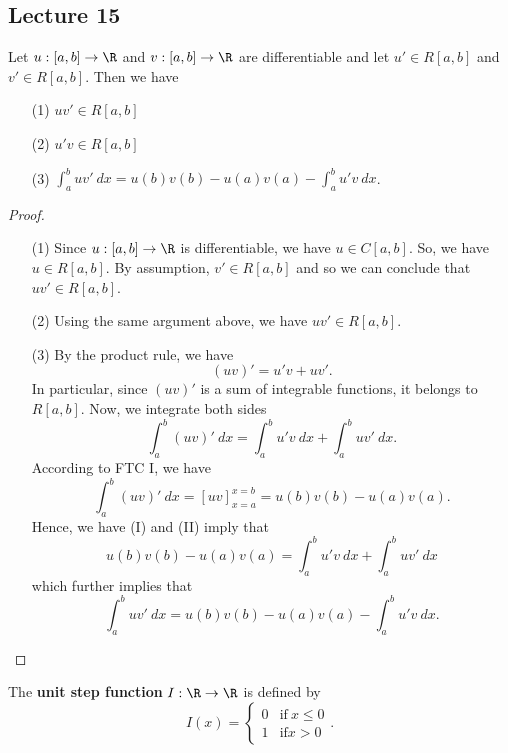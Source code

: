 \subsection{Lecture 15}

\begin{theorem}\label{Integration by Parts}
    Let \( u : [a,b] \to \R  \) and \( v : [a,b] \to \R  \) are differentiable and let \( u' \in R[a,b] \) and \( v' \in R[a,b] \). Then we have  
    \begin{enumerate}
        \item[(1)] \( uv' \in R [a,b] \)
        \item[(2)] \( u' v \in R[a,b] \)
        \item[(3)] \( \displaystyle  \int_{ a }^{ b }  uv'  \ dx = u(b)v(b) - u(a) v(a) - \displaystyle \int_{ a }^{ b } u' v  \ dx  \).
    \end{enumerate}
\end{theorem}

\begin{proof}
\begin{enumerate}
    \item[(1)] Since \( u:[a,b] \to \R  \) is differentiable, we have \( u \in C[a,b] \). So, we have \( u \in R[a,b] \). By assumption, \( v' \in R[a,b] \) and so we can conclude that \( uv' \in R[a,b] \).
    \item[(2)] Using the same argument above, we have \( uv' \in R[a,b] \).
    \item[(3)] By the product rule, we have 
        \[  (uv)' = u' v + u v'. \]
        In particular, since \( (uv)' \) is a sum of integrable functions, it belongs to \( R[a,b] \). Now, we integrate both sides 
        \[  \int_{ a }^{ b }  (uv)'   \ dx = \int_{ a }^{ b } u'v \ dx + \int_{ a }^{ b }  uv' \ dx. \tag{I} \]
        According to FTC I, we have
        \[  \int_{ a }^{ b } (uv)'  \ dx = [uv]_{x = a}^{x =b} = u(b)v(b) - u(a)v(a). \tag{II} \]
        Hence, we have (I) and (II) imply that
        \[  u(b)v(b) - u(a)v(a) = \int_{ a }^{ b } u'v \ dx + \int_{ a }^{ b }  u v' \ dx \]
        which further implies that 
        \[  \int_{ a }^{ b } uv' \ dx = u(b)v(b) - u(a)v(a) - \int_{ a }^{ b } u'v \ dx. \]
\end{enumerate}
\end{proof}

\begin{definition}\label{Unit Step Function}
    The \textbf{unit step function} \( I: \R \to \R  \) is defined by
    \[  I(x) = 
    \begin{cases}
        0 &\text{if} \ x \leq 0 \\
        1 &\text{if} x > 0 
    \end{cases}. \]
\end{definition}

